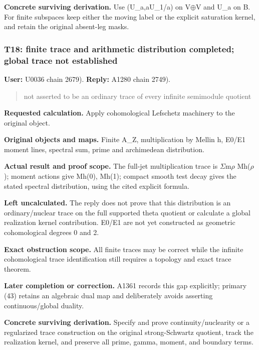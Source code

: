 \textbf{Concrete surviving derivation.} Use (U\_a,aU\_1/a) on
V\allowbreak{}\ensuremath{⊕}\allowbreak{}V and U\_a on B. For finite
subspaces keep either the moving label or the explicit saturation
kernel, and retain the original absent-leg masks.

\subsubsection{T18: finite trace and arithmetic distribution completed;
global trace not
established}\label{TranscriptLedgerStage:t18-finite-trace-and-arithmetic-distribution-completed-global-trace-not-established}

\textbf{User:} U0036
\protect{} chain 2679).
\textbf{Reply:} A1280
\protect{} chain 2749).

\begin{quote}
not asserted to be an ordinary trace of every infinite semimodule
quotient
\end{quote}

\textbf{Requested calculation.} Apply cohomological Lefschetz machinery
to the original object.

\textbf{Original objects and maps.} Finite A\_Z, multiplication by
Mellin h, E0/E1 moment lines, spectral sum, prime and archimedean
distribution.

\textbf{Actual result and proof scope.} The full-jet multiplication
trace is
\allowbreak{}\ensuremath{Σ}\allowbreak{}m\allowbreak{}\ensuremath{ρ}\allowbreak{}
Mh(\allowbreak{}\ensuremath{ρ}\allowbreak{}); moment actions give Mh(0),
Mh(1); compact smooth test decay gives the stated spectral distribution,
using the cited explicit formula.

\textbf{Left uncalculated.} The reply does not prove that this
distribution is an ordinary/nuclear trace on the full supported theta
quotient or calculate a global realization kernel contribution. E0/E1
are not yet constructed as geometric cohomological degrees 0 and 2.

\textbf{Exact obstruction scope.} All finite traces may be correct while
the infinite cohomological trace identification still requires a
topology and exact trace theorem.

\textbf{Later completion or correction.} A1361 records this gap
explicitly; primary (43) retains an algebraic dual map and deliberately
avoids asserting continuous/global duality.

\textbf{Concrete surviving derivation.} Specify and prove
continuity/nuclearity or a regularized trace construction on the
original strong-Schwartz quotient, track the realization kernel, and
preserve all prime, gamma, moment, and boundary terms.

